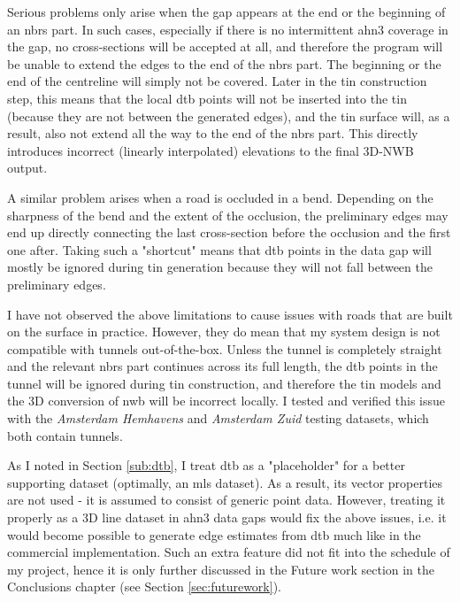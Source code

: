 Serious problems only arise when the gap appears at the end or the beginning of an \ac{nbrs} part. In such cases, especially if there is no intermittent \ac{ahn3} coverage in the gap, no cross-sections will be accepted at all, and therefore the program will be unable to extend the edges to the end of the \ac{nbrs} part. The beginning or the end of the centreline will simply not be covered. Later in the \ac{tin} construction step, this means that the local \ac{dtb} points will not be inserted into the \ac{tin} (because they are not between the generated edges), and the \ac{tin} surface will, as a result, also not extend all the way to the end of the \ac{nbrs} part. This directly introduces incorrect (linearly interpolated) elevations to the final 3D-NWB output.

A similar problem arises when a road is occluded in a bend. Depending on the sharpness of the bend and the extent of the occlusion, the preliminary edges may end up directly connecting the last cross-section before the occlusion and the first one after. Taking such a "shortcut" means that \ac{dtb} points in the data gap will mostly be ignored during \ac{tin} generation because they will not fall between the preliminary edges.

I have not observed the above limitations to cause issues with roads that are built on the surface in practice. However, they do mean that my system design is not compatible with tunnels out-of-the-box. Unless the tunnel is completely straight and the relevant \ac{nbrs} part continues across its full length, the \ac{dtb} points in the tunnel will be ignored during \ac{tin} construction, and therefore the \ac{tin} models and the 3D conversion of \ac{nwb} will be incorrect locally. I tested and verified this issue with the \textit{Amsterdam Hemhavens} and \textit{Amsterdam Zuid} testing datasets, which both contain tunnels.

As I noted in Section \ref{sub:dtb}, I treat \ac{dtb} as a "placeholder" for a better supporting dataset (optimally, an \ac{mls} dataset). As a result, its vector properties are not used - it is assumed to consist of generic point data. However, treating it properly as a 3D line dataset in \ac{ahn3} data gaps would fix the above issues, i.e. it would become possible to generate edge estimates from \ac{dtb} much like in the commercial implementation. Such an extra feature did not fit into the schedule of my project, hence it is only further discussed in the Future work section in the Conclusions chapter (see Section \ref{sec:futurework}).

